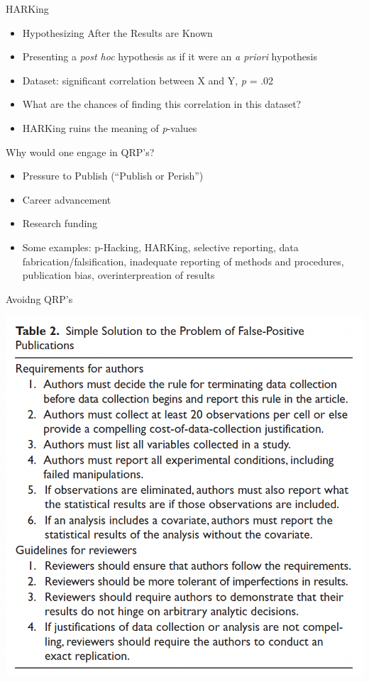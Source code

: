 \documentclass[
  ignorenonframetext,
  aspectratio=169,
]{beamer}
\providecommand{\tightlist}{%
  \setlength{\itemsep}{0pt}\setlength{\parskip}{0pt}}\usepackage{longtable,booktabs,array}
\begin{document}
\begin{frame}{HARKing}
\label{harking}
\begin{itemize}[<+->]
\tightlist
\item
  Hypothesizing After the Results are Known
\item
  Presenting a \emph{post hoc} hypothesis as if it were an \emph{a
  priori} hypothesis
\item
  Dataset: significant correlation between X and Y, \emph{p} = .02
\item
  What are the chances of finding this correlation in this dataset?
\item
  HARKing ruins the meaning of \emph{p}-values
\end{itemize}
\end{frame}

\begin{frame}{Why would one engage in QRP's?}
\label{why-would-one-engage-in-qrps}
\begin{itemize}[<+->]
\tightlist
\item
  Pressure to Publish (``Publish or Perish'')
\item
  Career advancement
\item
  Research funding
\item
  Some examples: p-Hacking, HARKing, selective reporting, data
  fabrication/falsification, inadequate reporting of methods and
  procedures, publication bias, overinterpreation of results
\end{itemize}
\end{frame}

\begin{frame}{Avoidng QRP's}
\label{avoidng-qrps}
\begin{center}
\includegraphics{figs/avoid-qrp.png}
\end{center}
\end{frame}
\end{document}
